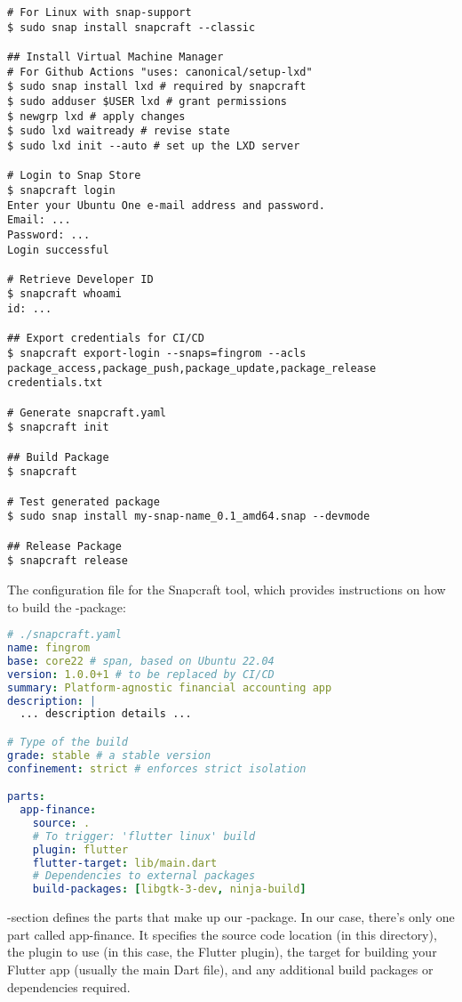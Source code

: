 \begin{lstlisting}[language=terminal]
# For Linux with snap-support
$ sudo snap install snapcraft --classic 

## Install Virtual Machine Manager
# For Github Actions "uses: canonical/setup-lxd"
$ sudo snap install lxd # required by snapcraft
$ sudo adduser $USER lxd # grant permissions
$ newgrp lxd # apply changes
$ sudo lxd waitready # revise state
$ sudo lxd init --auto # set up the LXD server

# Login to Snap Store
$ snapcraft login
Enter your Ubuntu One e-mail address and password.
Email: ...
Password: ...
Login successful 

# Retrieve Developer ID
$ snapcraft whoami
id: ...

## Export credentials for CI/CD
$ snapcraft export-login --snaps=fingrom --acls package_access,package_push,package_update,package_release credentials.txt

# Generate snapcraft.yaml
$ snapcraft init

## Build Package
$ snapcraft

# Test generated package
$ sudo snap install my-snap-name_0.1_amd64.snap --devmode

## Release Package
$ snapcraft release
\end{lstlisting}

\noindent The configuration file for the Snapcraft tool, which provides instructions on how to build the -package:

\begin{lstlisting}[language=yaml]
# ./snapcraft.yaml
name: fingrom
base: core22 # span, based on Ubuntu 22.04 
version: 1.0.0+1 # to be replaced by CI/CD
summary: Platform-agnostic financial accounting app
description: |
  ... description details ...

# Type of the build
grade: stable # a stable version
confinement: strict # enforces strict isolation

parts:
  app-finance:
    source: .
    # To trigger: 'flutter linux' build
    plugin: flutter
    flutter-target: lib/main.dart
    # Dependencies to external packages
    build-packages: [libgtk-3-dev, ninja-build]
\end{lstlisting}

\noindent {}-section defines the parts that make up our -package. In our case, there's only one part 
called app-finance. It specifies the source code location (in this directory), the plugin to use (in this case, the 
Flutter plugin), the target for building your Flutter app (usually the main Dart file), and any additional build 
packages or dependencies required.

